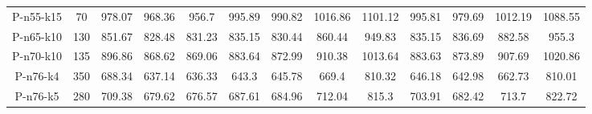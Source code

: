 \documentclass[11pt]{article} %
\begin{document}
\begin{enumerate}
\begin{landscape}
\begin{table}[p]
\begin{small}
\begin{tabular}{ccccccccccccc}
P-n55-k15&70&978.07&968.36&956.7&995.89&990.82&1016.86&1101.12&995.81&979.69&1012.19&1088.55\\
P-n65-k10&130&851.67&828.48&831.23&835.15&830.44&860.44&949.83&835.15&836.69&882.58&955.3\\
P-n70-k10&135&896.86&868.62&869.06&883.64&872.99&910.38&1013.64&883.63&873.89&907.69&1020.86\\
P-n76-k4&350&688.34&637.14&636.33&643.3&645.78&669.4&810.32&646.18&642.98&662.73&810.01\\
P-n76-k5&280&709.38&679.62&676.57&687.61&684.96&712.04&815.3&703.91&682.42&713.7&822.72\\
\bottomrule
\end{tabular}
\end{small}
\end{table}%


\end{landscape}
\end{enumerate}
\end{document}
